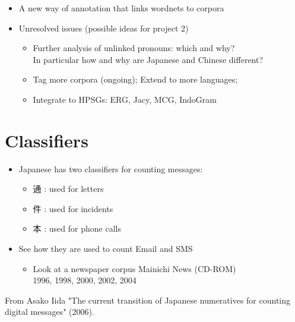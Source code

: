 \documentclass[a4paper,landscape,headrule,footrule,xetex]{foils}
\begin{document}
\begin{itemize}
\item A new way of annotation that links wordnets to corpora

\item Unresolved issues (possible ideas for project 2)
  \begin{itemize}
  \item Further analysis of unlinked pronouns: which and why?
    \\ In particular how and why are Japanese and Chinese different?
  \item Tag more corpora (ongoing); Extend to more languages;
  \item Integrate to HPSGs: ERG, Jacy, MCG, IndoGram
  \end{itemize}
\end{itemize}



\section{Classifiers}


\begin{itemize}
\item Japanese has two classifiers for counting messages:
  \begin{itemize}
  \item 通 : used for letters
  \item 件 : used for incidents
  \item 本 : used for phone calls
  \end{itemize}
\item See how they are used to count Email and SMS
  \begin{itemize}
  \item Look at a newspaper corpus Mainichi News (CD-ROM)
\\ 1996, 1998, 2000, 2002, 2004 
  \end{itemize}
\end{itemize}

From Asako Iida "The current transition of Japanese numeratives for counting digital messages" (2006).


\end{document}
